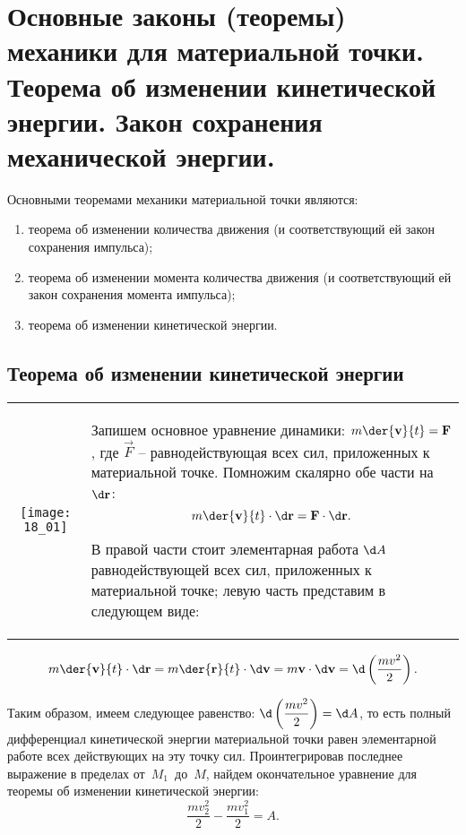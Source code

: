 \chapter{Основные законы (теоремы) механики для материальной точки. Теорема об
изменении кинетической энергии. Закон сохранения механической энергии.}

Основными теоремами механики материальной точки являются:
\begin{enumerate}
    \item теорема об изменении количества движения (и соответствующий ей закон
    сохранения импульса);
    \item теорема об изменении момента количества движения (и соответствующий ей
    закон сохранения момента импульса);
    \item теорема об изменении кинетической энергии.
\end{enumerate}

\section{Теорема об изменении кинетической энергии}

\begin{table}[h!]
    \begin{tabular}{C{.4}m{.5\textwidth}}
        \texttt{[image: 18\_01]} &
        Запишем основное уравнение динамики: \( \ds m\der{\vec{v}}{t} = \vec{F} \), где
        \( \vec{F} \) -- равнодействующая всех сил, приложенных к материальной точке.
        Помножим скалярно обе части на \( \d\vec{r} \):
        \[
            m\der{\vec{v}}{t}\cdot\d\vec{r} = \vec{F}\cdot\d\vec{r}.
        \]
        
        В правой части стоит элементарная работа \( \d A \) равнодействующей всех сил,
        приложенных к материальной точке; левую часть представим в следующем виде:
    \end{tabular}
\end{table}

\[
    m\der{\vec{v}}{t}\cdot\d\vec{r} = m\der{\vec{r}}{t}\cdot\d\vec{v} = m\vec{v}
    \cdot\d\vec{v} = \d\left(\frac{mv^2}{2}\right).
\]

Таким образом, имеем следующее равенство:
\( \ds \d\left(\frac{mv^2}{2}\right) = \d A\), то есть полный дифференциал
кинетической энергии материальной точки равен элементарной работе всех
действующих на эту точку сил. Проинтегрировав последнее выражение в пределах
от~\( M_1 \)~до~\( M \), найдем окончательное уравнение для теоремы об изменении
кинетической энергии:
\[
    \frac{mv_2^2}{2} - \frac{mv_1^2}{2} = A.
\]

